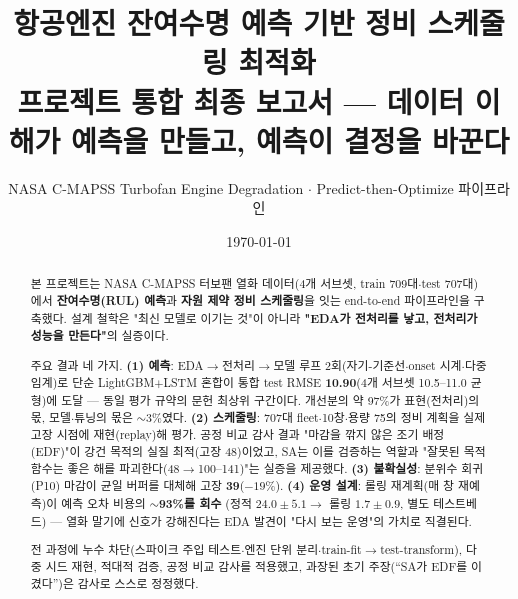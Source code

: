 \documentclass[11pt]{article}
\title{\textbf{항공엔진 잔여수명 예측 기반 정비 스케줄링 최적화}\\[4pt]
\large 프로젝트 통합 최종 보고서 — 데이터 이해가 예측을 만들고, 예측이 결정을 바꾼다}
\author{NASA C-MAPSS Turbofan Engine Degradation $\cdot$ Predict-then-Optimize 파이프라인}
\date{\today}
\begin{document}
\maketitle

\begin{abstract}
\noindent
본 프로젝트는 NASA C-MAPSS 터보팬 열화 데이터(4개 서브셋, train 709대$\cdot$test 707대)에서
\textbf{잔여수명(RUL) 예측}과 \textbf{자원 제약 정비 스케줄링}을 잇는 end-to-end 파이프라인을 구축했다.
설계 철학은 "최신 모델로 이기는 것"이 아니라 \textbf{"EDA가 전처리를 낳고, 전처리가 성능을 만든다"}의 실증이다.

주요 결과 네 가지.
\textbf{(1) 예측}: EDA$\to$전처리$\to$모델 루프 2회(자기-기준선$\cdot$onset 시계$\cdot$다중 임계)로
단순 LightGBM$+$LSTM 혼합이 통합 test RMSE \textbf{10.90}(4개 서브셋 10.5--11.0 균형)에 도달 —
동일 평가 규약의 문헌 최상위 구간이다. 개선분의 약 97\%가 표현(전처리)의 몫, 모델$\cdot$튜닝의 몫은 $\sim$3\%였다.
\textbf{(2) 스케줄링}: 707대 fleet$\cdot$10창$\cdot$용량 75의 정비 계획을 실제 고장 시점에 재현(replay)해 평가.
공정 비교 감사 결과 "마감을 깎지 않은 조기 배정(EDF)"이 강건 목적의 실질 최적(고장 48)이었고,
SA는 이를 검증하는 역할과 "잘못된 목적함수는 좋은 해를 파괴한다(48$\to$100--141)"는 실증을 제공했다.
\textbf{(3) 불확실성}: 분위수 회귀(P10) 마감이 균일 버퍼를 대체해 고장 \textbf{39}($-19\%$).
\textbf{(4) 운영 설계}: 롤링 재계획(매 창 재예측)이 예측 오차 비용의 \textbf{$\sim$93\%를 회수}
(정적 $24.0{\pm}5.1 \to$ 롤링 $1.7{\pm}0.9$, 별도 테스트베드) —
열화 말기에 신호가 강해진다는 EDA 발견이 "다시 보는 운영"의 가치로 직결된다.

전 과정에 누수 차단(스파이크 주입 테스트$\cdot$엔진 단위 분리$\cdot$train-fit$\to$test-transform),
다중 시드 재현, 적대적 검증, 공정 비교 감사를 적용했고,
과장된 초기 주장(``SA가 EDF를 이겼다'')은 감사로 스스로 정정했다.
\end{abstract}
\vspace{0.5em}
\begin{center}\end{center}
\vspace{0.5em}


\tableofcontents
\newpage
\end{document}
